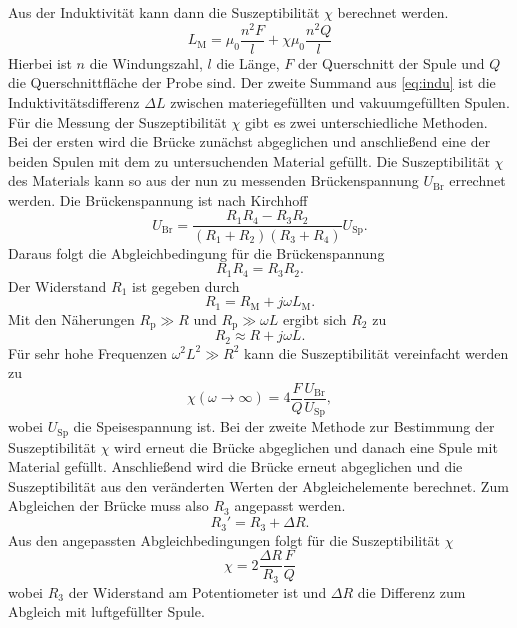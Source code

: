 Aus der Induktivität kann dann die Suszeptibilität $\chi$ berechnet werden.
\begin{equation}
\label{eq:indu}
L_\text{M} = \mu_0 \frac{n^2F}{l} + \chi \mu_0 \frac{n^2Q}{l}
\end{equation}
Hierbei ist $n$ die Windungszahl, $l$ die Länge, $F$ der Querschnitt der Spule und $Q$ die Querschnittfläche der Probe sind.
Der zweite Summand aus \autoref{eq:indu} ist die Induktivitätsdifferenz $\Delta L$ zwischen materiegefüllten und vakuumgefüllten Spulen.
Für die Messung der Suszeptibilität $\chi$ gibt es zwei unterschiedliche Methoden.
Bei der ersten wird die Brücke zunächst abgeglichen und anschließend eine der beiden Spulen mit dem zu untersuchenden
Material gefüllt. Die Suszeptibilität $\chi$ des Materials kann so aus der nun zu messenden Brückenspannung $U_\text{Br}$ errechnet werden.
Die Brückenspannung ist nach Kirchhoff
\begin{equation*}
U_\text{Br} = \frac{R_1R_4-R_3R_2}{(R_1+R_2)(R_3+R_4)}U_\text{Sp}.
\end{equation*}
Daraus folgt die Abgleichbedingung für die Brückenspannung
\begin{equation*}
R_1R_4 = R_3R_2.
\end{equation*}
Der Widerstand $R_1$ ist gegeben durch
\begin{equation*}
R_1 = R_\text{M} + j \omega L_\text{M}.
\end{equation*}
Mit den Näherungen $R_\text{p} \gg R $ und $R_\text{p} \gg \omega L$ ergibt sich $R_2$ zu
\begin{equation*}
R_2 \approx R + j \omega L.
\end{equation*}
Für sehr hohe Frequenzen $\omega^2 L^2 \gg R^2$ kann die Suszeptibilität vereinfacht werden zu
\begin{equation}
	\label{eqn:susz1}
	\chi(\omega \rightarrow \infty) = 4 \frac{F}{Q}\frac{U_\text{Br}}{U_\text{Sp}},
\end{equation}
wobei $U_\text{Sp}$ die Speisespannung ist.
Bei der zweite Methode zur Bestimmung der Suszeptibilität $\chi$ wird erneut die Brücke abgeglichen und danach eine Spule mit Material gefüllt. Anschließend wird die Brücke erneut
abgeglichen und die Suszeptibilität aus den veränderten Werten der Abgleichelemente berechnet.
Zum Abgleichen der Brücke muss also $R_3$ angepasst werden.
\begin{equation*}
R_3' = R_3 + \Delta R.
\end{equation*}
Aus den angepassten Abgleichbedingungen folgt für die Suszeptibilität $\chi$
\begin{equation}
	\label{eqn:susz2}
	\chi = 2 \frac{\Delta R}{R_3}\frac{F}{Q}
\end{equation}
wobei $R_3$ der Widerstand am Potentiometer ist und $\Delta R$ die Differenz zum Abgleich mit luftgefüllter Spule.

\cite{Anleitung606}
